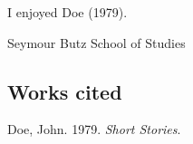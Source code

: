 
%
\newlength{\cslhangindent}
\setlength{\cslhangindent}{1.5em}
\newlength{\csllabelwidth}
\setlength{\csllabelwidth}{3em}
\newenvironment{CSLReferences}[2] %
 {%
  \setlength{\parindent}{0pt}
  \ifodd #1 \everypar{\setlength{\hangindent}{\cslhangindent}}\ignorespaces\fi
  \ifnum #2 > 0
  \setlength{\parskip}{#2\baselineskip}
  \fi
 }%
 {}
\usepackage{calc}
\newcommand{\CSLBlock}[1]{#1\hfill\break}
\newcommand{\CSLLeftMargin}[1]{\parbox[t]{\csllabelwidth}{#1}}
\newcommand{\CSLRightInline}[1]{\parbox[t]{\linewidth - \csllabelwidth}{#1}\break}
\newcommand{\CSLIndent}[1]{\hspace{\cslhangindent}#1}



I enjoyed Doe (1979).

Seymour Butz
School of Studies


\hypertarget{works-cited}{%
\subsection*{Works cited}\label{works-cited}}
\hypertarget{refs}{}
\begin{CSLReferences}{1}{0}
\leavevmode{}%
Doe, John. 1979. \emph{Short Stories}.

\end{CSLReferences}


%





